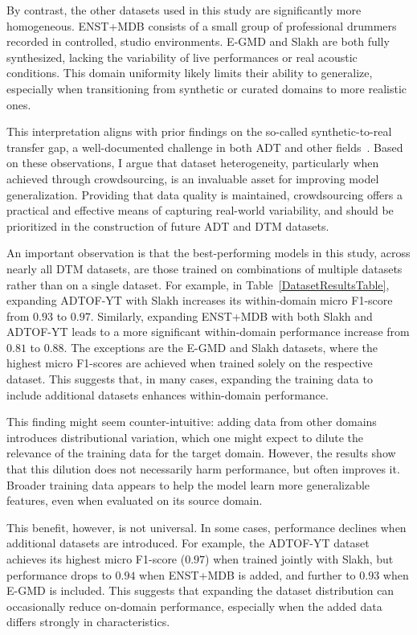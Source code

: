 By contrast, the other datasets used in this study are significantly more homogeneous. ENST+MDB consists of a small group of professional drummers recorded in controlled, studio environments. E-GMD and Slakh are both fully synthesized, lacking the variability of live performances or real acoustic conditions. This domain uniformity likely limits their ability to generalize, especially when transitioning from synthetic or curated domains to more realistic ones.

This interpretation aligns with prior findings on the so-called synthetic-to-real transfer gap, a well-documented challenge in both \gls{ADT} and other fields~\cite{zehren2024analyzingreducingsynthetictorealtransfer}. Based on these observations, I argue that dataset heterogeneity, particularly when achieved through crowdsourcing, is an invaluable asset for improving model generalization. Providing that data quality is maintained, crowdsourcing offers a practical and effective means of capturing real-world variability, and should be prioritized in the construction of future \gls{ADT} and \gls{DTM} datasets.

An important observation is that the best-performing models in this study, across nearly all \gls{DTM} datasets, are those trained on combinations of multiple datasets rather than on a single dataset. For example, in Table~\ref{DatasetResultsTable}, expanding ADTOF-YT with Slakh increases its within-domain micro F1-score from $0.93$ to $0.97$. Similarly, expanding ENST+MDB with both Slakh and ADTOF-YT leads to a more significant within-domain performance increase from $0.81$ to $0.88$. The exceptions are the E-GMD and Slakh datasets, where the highest micro F1-scores are achieved when trained solely on the respective dataset. This suggests that, in many cases, expanding the training data to include additional datasets enhances within-domain performance.

This finding might seem counter-intuitive: adding data from other domains introduces distributional variation, which one might expect to dilute the relevance of the training data for the target domain. However, the results show that this dilution does not necessarily harm performance, but often improves it. Broader training data appears to help the model learn more generalizable features, even when evaluated on its source domain. 

This benefit, however, is not universal. In some cases, performance declines when additional datasets are introduced. For example, the ADTOF-YT dataset achieves its highest micro F1-score ($0.97$) when trained jointly with Slakh, but performance drops to $0.94$ when ENST+MDB is added, and further to $0.93$ when E-GMD is included. This suggests that expanding the dataset distribution can occasionally reduce on-domain performance, especially when the added data differs strongly in characteristics.

